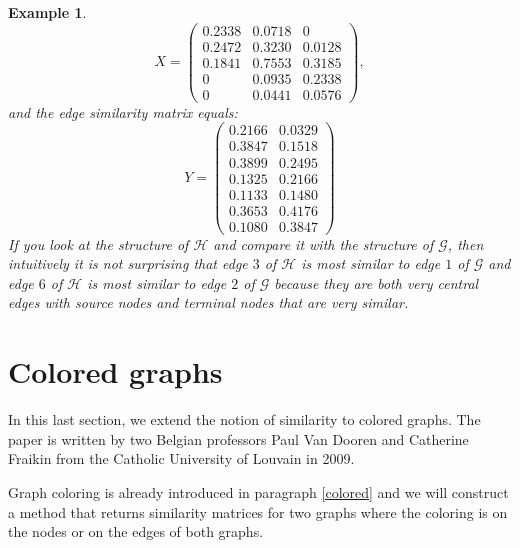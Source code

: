 \documentclass[a4paper,11pt]{report}
\newtheorem{example}[theorem]{Example}
\newcommand{\graf}{\mathscr{G}}
\newcommand{\grafeen}{\mathscr{H}}
\begin{document}
\begin{example}
$$X = \begin{pmatrix}
0.2338  &  0.0718  &       0\\
0.2472   & 0.3230  &  0.0128\\
0.1841   &  0.7553 &   0.3185\\
0  &  0.0935  &  0.2338\\
0   & 0.0441 &   0.0576
\end{pmatrix},$$
 and the edge similarity matrix equals:
 $$ Y = \begin{pmatrix}
0.2166 & 0.0329\\
0.3847 & 0.1518\\
0.3899 & 0.2495\\
0.1325 & 0.2166\\
0.1133 & 0.1480\\
0.3653 & 0.4176\\
0.1080 & 0.3847
\end{pmatrix}$$
If you look at the structure of $\grafeen$ and compare it with the structure of $\graf$, then 
intuitively it is not surprising that edge $3$ of $\grafeen$ is most similar to edge $1$ of 
$\graf$ and edge $6$ of $\grafeen$ is most similar to edge $2$ of $\graf$ because they are both very
central edges with source nodes and terminal nodes that are very similar.
 \end{example}
 


\section{Colored graphs}
In this last section, we extend the notion of similarity to colored graphs. The 
paper \cite{vandoren} is written by two Belgian professors Paul Van Dooren and 
Catherine Fraikin from the Catholic University of 
Louvain in 2009.

Graph coloring is already introduced in paragraph \ref{colored} and we will 
construct a method that returns similarity matrices for two graphs where the coloring is on the nodes or 
on the edges of both graphs. 
\end{document}
